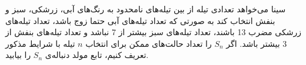 \p              
  سینا می‌خواهد تعدادی تیله از بین تیله‌های نامحدود به رنگ‌های آبی، زرشکی، سبز و بنفش انتخاب کند به صورتی که تعداد تیله‌های آبی حتما زوج باشد، تعداد تیله‌های زرشکی مضرب 13 باشند، تعداد تیله‌های سبز بیشتر از 7 نباشد و تعداد تیله‌های بنفش از 3 بیشتر باشد. اگر  
  $S_n$
   را تعداد حالت‌های ممکن برای انتخاب
    $n$ 
     تیله با شرایط مذکور تعریف کنیم، تابع مولد دنباله‌ی
     $S_n$ 
     را بیابید.
